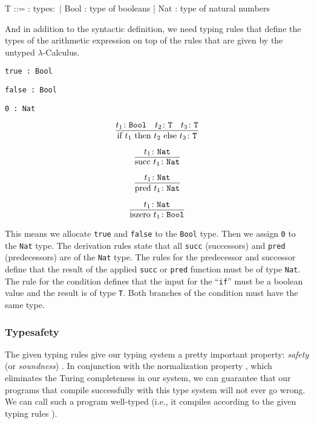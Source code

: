 \begin{bnfgrammar}
    T ::= : types$\colon$
    | Bool : type of booleans
    | Nat : type of natural numbers
\end{bnfgrammar}

And in addition to the syntactic definition, we need typing rules
that define the types of the arithmetic expression on top of
the rules that are given by the untyped $\lambda$-Calculus.

\begin{center}
    \texttt{true : Bool}
    
    \texttt{false : Bool}
    
    \texttt{0 : Nat}
\end{center}

\[\infer{ \text{if } t_1 \text{ then } t_2 \text{ else } t_3 \colon \texttt{T} }{ t_1 \colon \texttt{Bool} & t_2 \colon \texttt{T} & t_3 \colon \texttt{T} }\]

\[\infer{ \text{succ } t_1 \colon \texttt{Nat} }{ t_1 \colon \texttt{Nat} }\]

\[\infer{ \text{pred } t_1 \colon \texttt{Nat} }{ t_1 \colon \texttt{Nat} }\]

\[\infer{ \text{iszero } t_1 \colon \texttt{Bool} }{ t_1 \colon \texttt{Nat} }\]

This means we allocate \texttt{true} and \texttt{false} to the \texttt{Bool} type.
Then we assign \texttt{0} to the \texttt{Nat} type. 
The derivation rules state that all \texttt{succ} (successors) and \texttt{pred} (predecessors) are of the
\texttt{Nat} type. The rules for the predecessor and successor define that the result
of the applied \texttt{succ} or \texttt{pred} function must be of type \texttt{Nat}. The rule for the condition
defines that the input for the ``\texttt{if}'' must be a boolean value and the result is
of type \texttt{T}. Both branches of the condition must have the same type.

\subsubsection{Typesafety}

The given typing rules give our typing system a pretty important property:
\textit{safety} (or \textit{soundness}) \cite{pierce2002ProgLang}.
In conjunction with the normalization property \cite{pierce2002ProgLang} \cite{baader_nipkow_1998},
which eliminates the Turing completeness in our system, we can guarantee that our programs
that compile successfully with this type system will not ever go wrong. We can call
such a program well-typed (i.e., it compiles according to the given typing rules \cite{cardelliTypeSystems}).

